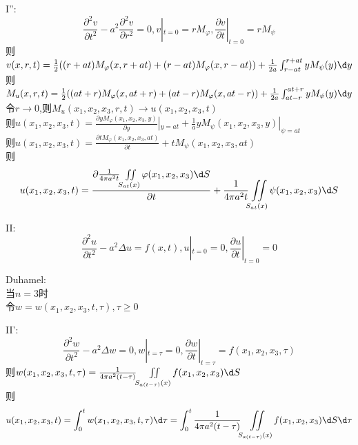 \begin{jie}
\rm{I}'':
\[\frac{\partial^2 v}{\partial t^2}-a^2\frac{\partial^2 v}{\partial r^2}=0,v|_{t=0}=rM_{\varphi},\frac{\partial v}{\partial t}|_{t=0}=rM_{\psi}\]
则$v(x,r,t)=\frac{1}{2}((r+at)M_{\varphi}(x,r+at)+(r-at)M_{\varphi}(x,r-at))+\frac{1}{2a}\int_{r-at}^{r+at}yM_{\psi}(y)\d y$\\
则$M_{u}(x,r,t)=\frac{1}{2}((at+r)M_{\varphi}(x,at+r)+(at-r)M_{\varphi}(x,at-r))+\frac{1}{2a}\int_{at-r}^{at+r}yM_{\psi}(y)\d y$\\
令$r\to 0$,则$M_{u}(x_1,x_2,x_3,r,t)\to u(x_1,x_2,x_3,t)$\\
则$u(x_1,x_2,x_3,t)=\frac{\partial yM_{\varphi}(x_1,x_2,x_3,y)}{\partial y}|_{y=at}+\frac{1}{a}yM_{\psi}(x_1,x_2,x_3,y)|_{\psi=at}$\\
则$u(x_1,x_2,x_3,t)=\frac{\partial t M_{\varphi}(x_1,x_2,x_3,at)}{\partial t}+tM_{\psi}(x_1,x_2,x_3,at)$\\
则\[u(x_1,x_2,x_3,t)=\frac{\partial \frac{1}{4\pi a^2t}\iint\limits_{S_{at}(x)}\varphi(x_1,x_2,x_3)\d S}{\partial t}+\frac{1}{4\pi a^2t}\iint\limits_{S_{at}(x)}\psi(x_1,x_2,x_3)\d S\]
\end{jie}
II:\[\frac{\partial^2 u}{\partial t^2}-a^2\Delta u=f(x,t),u|_{t=0}=0,\frac{\partial u}{\partial t}|_{t=0}=0\]

\begin{jie}
Duhamel:\\
当$n=3$时\\
令$w=w(x_1,x_2,x_3,t,\tau),\tau\geq 0$

\rm{II'}:
\[\frac{\partial^2 w}{\partial t^2}-a^2\Delta w=0,w|_{t=\tau}=0,\frac{\partial w}{\partial t}|_{t=\tau}=f(x_1,x_2,x_3,\tau)\]
则$w(x_1,x_2,x_3,t,\tau)=\frac{1}{4\pi a^2(t-\tau)}\iint\limits_{S_{a(t-\tau)}(x)}f(x_1,x_2,x_3)\d S$\\
则\[u(x_1,x_2,x_3,t)=\int_{0}^{t}w(x_1,x_2,x_3,t,\tau)\d \tau=\int_{0}^{t}\frac{1}{4\pi a^2(t-\tau)}\iint\limits_{S_{a(t-\tau)}(x)}f(x_1,x_2,x_3)\d S\d \tau\]
\end{jie}


